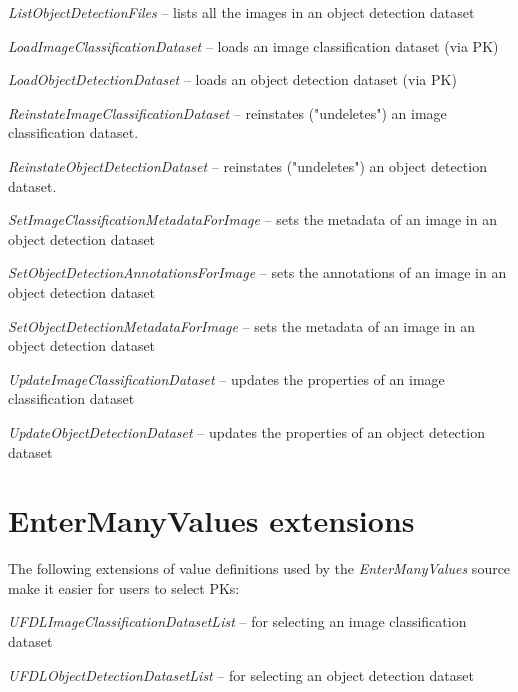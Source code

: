 \documentclass[a4paper]{book}
\begin{document}
\begin{tight_itemize}
  \item \textit{ListObjectDetectionFiles} -- lists all the images in an object detection dataset
  \item \textit{LoadImageClassificationDataset} -- loads an image classification dataset (via PK)
  \item \textit{LoadObjectDetectionDataset} -- loads an object detection dataset (via PK)
  \item \textit{ReinstateImageClassificationDataset} -- reinstates ("undeletes") an image classification dataset.
  \item \textit{ReinstateObjectDetectionDataset} -- reinstates ("undeletes") an object detection dataset.
  \item \textit{SetImageClassificationMetadataForImage} -- sets the metadata of an image in an object detection dataset
  \item \textit{SetObjectDetectionAnnotationsForImage} -- sets the annotations of an image in an object detection dataset
  \item \textit{SetObjectDetectionMetadataForImage} -- sets the metadata of an image in an object detection dataset
  \item \textit{UpdateImageClassificationDataset} -- updates the properties of an image classification dataset
  \item \textit{UpdateObjectDetectionDataset} -- updates the properties of an object detection dataset
\end{tight_itemize}

\section{EnterManyValues extensions}
The following extensions of value definitions used by the \textit{EnterManyValues}
source make it easier for users to select PKs:
\begin{tight_itemize}
  \item \textit{UFDLImageClassificationDatasetList} -- for selecting an image classification dataset
  \item \textit{UFDLObjectDetectionDatasetList} -- for selecting an object detection dataset
\end{tight_itemize}


\end{document}

